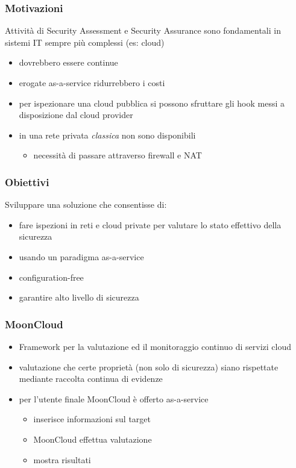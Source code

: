 \begin{frame}
    \frametitle{Motivazioni}
    
    Attività di \alert{Security Assessment} e \alert{Security Assurance} sono 
    fondamentali in sistemi IT sempre più \alert{complessi} (es: cloud)
    \begin{itemize}
        \item dovrebbero essere \alert{continue}
        \item erogate \alert{as-a-service} ridurrebbero i costi
    \end{itemize}
			
	\begin{itemize}
		\item per ispezionare una cloud pubblica si possono sfruttare
		      gli \alert{hook} messi a disposizione dal cloud provider
		\item in una rete privata \textit{classica} non sono disponibili
		      		      		      
		      \begin{itemize}
		      	\item necessità di passare attraverso \alert{firewall} e \alert{NAT}
		      \end{itemize}
	\end{itemize}
			
\end{frame}

\begin{frame}
	\frametitle{Obiettivi}
	Sviluppare una soluzione che consentisse di:
	\begin{itemize}
		\item fare \alert{ispezioni} in reti e cloud private per
		      valutare lo \alert{stato effettivo} della sicurezza
		\item usando un paradigma \alert{as-a-service}
		\item \alert{configuration-free}
		\item garantire alto livello di sicurezza
	\end{itemize}
\end{frame}

\begin{frame}
	\frametitle{MoonCloud}
	\begin{itemize}
		\item Framework per la \alert{valutazione}
		      ed il \alert{monitoraggio continuo} di servizi
		      cloud
		\item valutazione che certe proprietà (non solo di sicurezza)
		      siano rispettate
		      mediante \alert{raccolta continua di evidenze}
		\item per l'utente finale MoonCloud è offerto \alert{as-a-service}
		      \begin{itemize}
		      	\item inserisce informazioni sul target
		      	\item MoonCloud effettua valutazione
		      	\item mostra risultati
		      \end{itemize}
	\end{itemize}
\end{frame}


